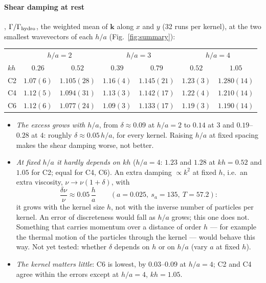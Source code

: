 \documentclass[11pt,aps,preprint,nofootinbib,superscriptaddress,tightenlines]{revtex4-2}
\def\st{\begin{equation}}
\def\stp{\end{equation}}
\def\Fig#1{Fig.~\ref{#1}}
\let\oldparagraph\paragraph
\renewcommand{\paragraph}{\par\bigskip\oldparagraph}
\begin{document}
\paragraph{Shear damping at rest}, $\Gamma/\Gamma_{\rm hydro}$, the weighted mean of $\bm k$ along $x$ and $y$ (32 runs per kernel), at the two
smallest wavevectors of each $h/a$ (\Fig{fig:summary}):
\begin{center}
\begin{tabular}{lcccccc}
\hline
 & \multicolumn{2}{c}{$h/a=2$} & \multicolumn{2}{c}{$h/a=3$} & \multicolumn{2}{c}{$h/a=4$} \\
$kh$ & $0.26$ & $0.52$ & $0.39$ & $0.79$ & $0.52$ & $1.05$ \\ \hline
C2 & $1.07(6)$ & $1.105(28)$ & $1.16(4)$ & $1.145(21)$ & $1.23(3)$ & $1.280(14)$ \\
C4 & $1.12(5)$ & $1.094(31)$ & $1.13(3)$ & $1.142(17)$ & $1.22(4)$ & $1.210(14)$ \\
C6 & $1.12(6)$ & $1.077(24)$ & $1.09(3)$ & $1.133(17)$ & $1.19(3)$ & $1.190(14)$ \\
\hline
\end{tabular}
\end{center}
\begin{itemize}
\item \emph{The excess grows with $h/a$}, from $\delta\approx0.09$ at $h/a=2$ to $0.14$ at $3$ and $0.19$--$0.28$ at $4$: roughly $\delta\approx0.05\,h/a$, for every
  kernel.  Raising $h/a$ at fixed spacing makes the shear damping worse, not better.
\item \emph{At fixed $h/a$ it hardly depends on $kh$} ($h/a=4$: $1.23$ and $1.28$ at $kh=0.52$ and $1.05$ for C2; equal for C4, C6).  An extra damping
  $\propto k^2$ at fixed $h$, i.e.\ an extra viscosity, $\nu\to\nu(1+\delta)$, with
  \st
  \frac{\delta\nu}{\nu}\approx0.05\,\frac ha\qquad(a=0.025,\ s_a=135,\ T=57.2):
  \stp
  it grows with the kernel size $h$, not with the inverse number of particles per kernel.  An error of discreteness would fall as $h/a$
  grows; this one does not.  Something that carries momentum over a distance of order $h$ --- for example the thermal motion of the
  particles through the kernel --- would behave this way.  Not yet tested: whether $\delta$ depends on $h$ or on $h/a$ (vary $a$ at fixed $h$).
\item \emph{The kernel matters little}: C6 is lowest, by $0.03$--$0.09$ at $h/a=4$; C2 and C4 agree within the errors except at $h/a=4$, $kh=1.05$.
\end{itemize}
\end{document}
